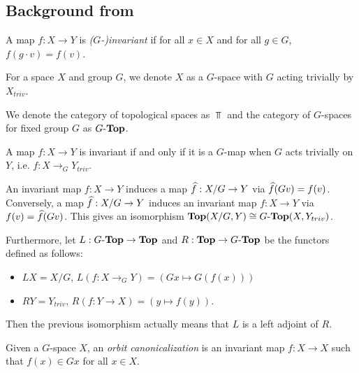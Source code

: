 \subsection{Background from \cite{dym2024equivariant}}\label{sec:bg-dym}
\begin{definition}
    A map $f : X \to Y$ is \emph{($G$-)invariant} if for all $x \in X$ and for all $g \in G$, $f(g \cdot v) = f(v)$.
\end{definition}

\begin{definition}
    For a space $X$ and group $G$, we denote $X$ as a $G$-space with $G$ acting trivially by $X_{triv}$.
\end{definition}

\begin{definition}
    We denote the category of topological spaces as $\Top$ and the category of $G$-spaces for fixed group $G$ as $\GTop$.
\end{definition}

\begin{remark}
    A map $f : X \to Y$ is invariant if and only if it is a $G$-map when $G$ acts trivially on $Y$, i.e. $f : X \to_G Y_{triv}$.
\end{remark}

\begin{remark}\label{rem:top-cong-gtop}
    An invariant map $f : X \to Y$ induces a map $\Hat{f} : X/G \to Y$ via $\Hat{f} (Gv) = f(v)$.
    Conversely, a map $\Hat{f} : X/G \to Y$ induces an invariant map $f : X \to Y$ via $f(v) = \Hat{f}(Gv)$.
    This gives an isomorphism $\Top(X/G,Y) \cong \GTop(X,Y_{triv})$.
    
    Furthermore, let $L : \GTop \to \Top$ and $R : \Top \to \GTop$ be the functors defined as follows:
    \begin{itemize}
        \item $LX = X/G$, $L(f : X \to_G Y) = (Gx \mapsto G(f(x)))$
        \item $RY = Y_{triv}$, $R(f : Y \to X) = (y \mapsto f(y))$.
    \end{itemize}
    Then the previous isomorphism actually means that $L$ is a left adjoint of $R$.
\end{remark}

\begin{definition}
    Given a $G$-space $X$, an \emph{orbit canonicalization} is an invariant map $f : X \to X$ such that $f(x) \in Gx$ for all $x \in X$.
\end{definition}

